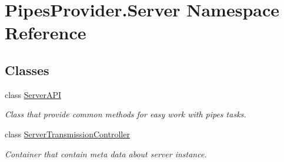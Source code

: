 \hypertarget{namespace_pipes_provider_1_1_server}{}\section{Pipes\+Provider.\+Server Namespace Reference}
\label{namespace_pipes_provider_1_1_server}
\subsection*{Classes}
\begin{DoxyCompactItemize}
\item 
class \mbox{\hyperlink{class_pipes_provider_1_1_server_1_1_server_a_p_i}{Server\+A\+PI}}
\begin{DoxyCompactList}\small\item\em Class that provide common methods for easy work with pipes\textquotesingle{} tasks. \end{DoxyCompactList}\item 
class \mbox{\hyperlink{class_pipes_provider_1_1_server_1_1_server_transmission_controller}{Server\+Transmission\+Controller}}
\begin{DoxyCompactList}\small\item\em Container that contain meta data about server instance. \end{DoxyCompactList}\end{DoxyCompactItemize}
